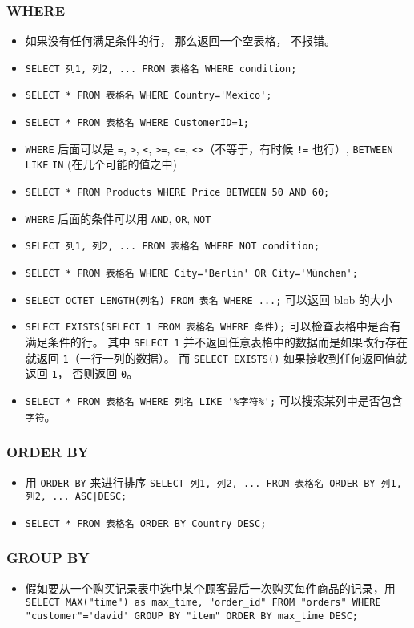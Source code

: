 \subsubsection{WHERE}
\begin{itemize}
\item 如果没有任何满足条件的行， 那么返回一个空表格， 不报错。
\item \verb`SELECT 列1, 列2, ... FROM 表格名 WHERE condition;`
\item \verb`SELECT * FROM 表格名 WHERE Country='Mexico';`
\item \verb`SELECT * FROM 表格名 WHERE CustomerID=1;`
\item \verb`WHERE` 后面可以是 \verb`=`, \verb`>`, \verb`<`, \verb`>=`, \verb`<=`, \verb`<>`（不等于，有时候 \verb`!=` 也行）, \verb`BETWEEN` \verb`LIKE` \verb`IN` (在几个可能的值之中)
\item \verb`SELECT * FROM Products WHERE Price BETWEEN 50 AND 60;`
\item \verb`WHERE` 后面的条件可以用 \verb`AND`, \verb`OR`, \verb`NOT`
\item \verb`SELECT 列1, 列2, ... FROM 表格名 WHERE NOT condition;`
\item \verb`SELECT * FROM 表格名 WHERE City='Berlin' OR City='München';`
\item \verb`SELECT OCTET_LENGTH(列名) FROM 表名 WHERE ...;` 可以返回 blob 的大小
\item \verb`SELECT EXISTS(SELECT 1 FROM 表格名 WHERE 条件);` 可以检查表格中是否有满足条件的行。 其中 \verb`SELECT 1` 并不返回任意表格中的数据而是如果改行存在就返回 \verb`1`（一行一列的数据）。 而 \verb`SELECT EXISTS()` 如果接收到任何返回值就返回 \verb`1`， 否则返回 \verb`0`。
\item \verb`SELECT * FROM 表格名 WHERE 列名 LIKE '%字符%';` 可以搜索某列中是否包含 \verb`字符`。
\end{itemize}

\subsubsection{ORDER BY}
\begin{itemize}
\item 用 \verb`ORDER BY` 来进行排序 \verb`SELECT 列1, 列2, ... FROM 表格名 ORDER BY 列1, 列2, ... ASC|DESC;`
\item \verb`SELECT * FROM 表格名 ORDER BY Country DESC;`
\end{itemize}

\subsubsection{GROUP BY}
\begin{itemize}
\item 假如要从一个购买记录表中选中某个顾客最后一次购买每件商品的记录，用 \verb`SELECT MAX("time") as max_time, "order_id" FROM "orders" WHERE "customer"='david' GROUP BY "item" ORDER BY max_time DESC;`
\end{itemize}

